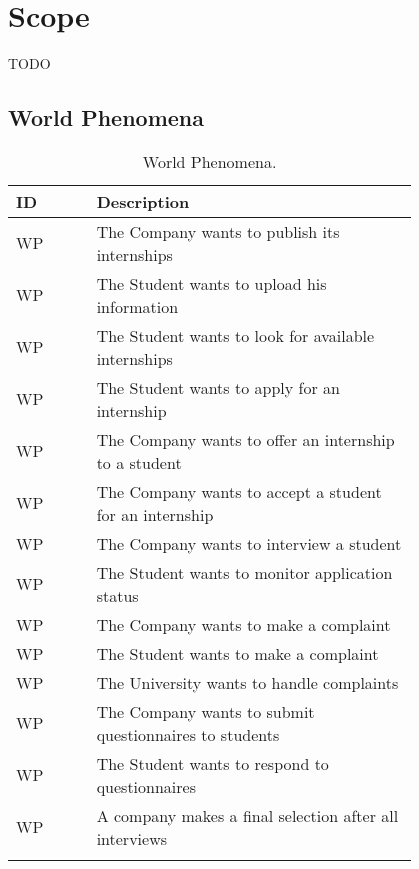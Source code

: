 \section{Scope}
\label{sec:scope}%
TODO

\newpage

\subsection{World Phenomena}
\label{subsec:world_phenomena}%
\setcounter{wp}{1}
\newcommand{\cwp}{\thewp\stepcounter{wp}}
\begin{center}
    \begin{longtable}{ |l|p{0.8\linewidth}| }
        \hline
        \textbf{ID} & \textbf{Description}                                                \\
        \hline
        WP\cwp      & The Company wants to publish its internships\\
        \hline
        WP\cwp      & The Student wants to upload his information \\
        \hline
        WP\cwp      & The Student wants to look for available internships \\
        \hline
        WP\cwp      & The Student wants to apply for an internship \\
        \hline
        WP\cwp      & The Company wants to offer an internship to a student \\
        \hline
        WP\cwp      & The Company wants to accept a student for an internship \\
        \hline
        WP\cwp      & The Company wants to interview a student \\
        \hline
        WP\cwp      & The Student wants to monitor application status \\
        \hline
        WP\cwp      & The Company wants to make a complaint \\
        \hline
        WP\cwp      & The Student wants to make a complaint \\
        \hline
        WP\cwp      & The University wants to handle complaints \\
        \hline
        WP\cwp      & The Company wants to submit questionnaires to students \\
        \hline
        WP\cwp      & The Student wants to respond to questionnaires \\
        \hline
        WP\cwp      & A company makes a final selection after all interviews \\
        \hline
        \caption{World Phenomena.}
        \label{tab:worldph_tab}%
    \end{longtable}
\end{center}

